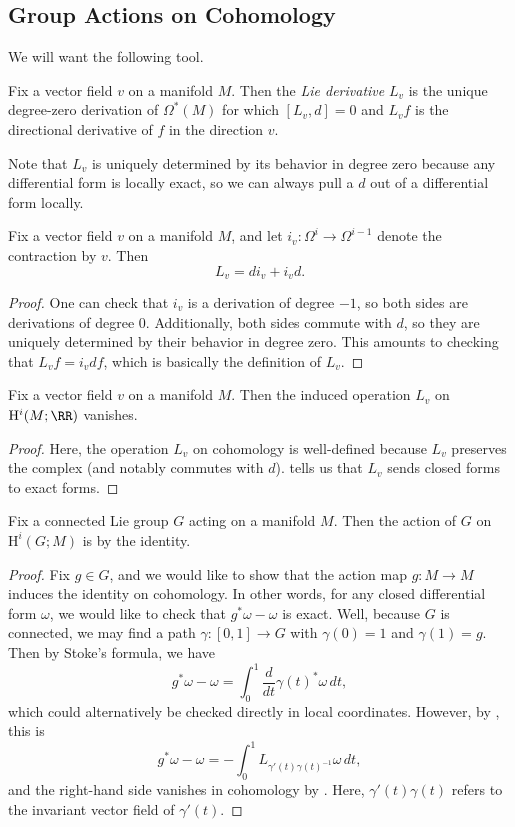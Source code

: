 \documentclass[../notes.tex]{subfiles}
\begin{document}
\subsection{Group Actions on Cohomology}
We will want the following tool.
\begin{definition}
	Fix a vector field $v$ on a manifold $M$. Then the \textit{Lie derivative} $L_v$ is the unique degree-zero derivation of $\Omega^*(M)$ for which $[L_v,d]=0$ and $L_vf$ is the directional derivative of $f$ in the direction $v$.
\end{definition}
\begin{remark}
	Note that $L_v$ is uniquely determined by its behavior in degree zero because any differential form is locally exact, so we can always pull a $d$ out of a differential form locally.
\end{remark}
\begin{proposition} \label{prop:cartan-magic}
	Fix a vector field $v$ on a manifold $M$, and let $i_v\colon\Omega^i\to\Omega^{i-1}$ denote the contraction by $v$. Then
	\[L_v=di_v+i_vd.\]
\end{proposition}
\begin{proof}
	One can check that $i_v$ is a derivation of degree $-1$, so both sides are derivations of degree $0$. Additionally, both sides commute with $d$, so they are uniquely determined by their behavior in degree zero. This amounts to checking that $L_vf=i_vdf$, which is basically the definition of $L_v$.
\end{proof}
\begin{corollary} \label{cor:vector-field-action-vanishes}
	Fix a vector field $v$ on a manifold $M$. Then the induced operation $L_v$ on $\mathrm H^i(M;\RR)$ vanishes.
\end{corollary}
\begin{proof}
	Here, the operation $L_v$ on cohomology is well-defined because $L_v$ preserves the complex (and notably commutes with $d$).  tells us that $L_v$ sends closed forms to exact forms.
\end{proof}
\begin{corollary} \label{cor:group-acts-by-identity}
	Fix a connected Lie group $G$ acting on a manifold $M$. Then the action of $G$ on $\mathrm H^i(G;M)$ is by the identity.
\end{corollary}
\begin{proof}
	Fix $g\in G$, and we would like to show that the action map $g\colon M\to M$ induces the identity on cohomology. In other words, for any closed differential form $\omega$, we would like to check that $g^*\omega-\omega$ is exact. Well, because $G$ is connected, we may find a path $\gamma\colon[0,1]\to G$ with $\gamma(0)=1$ and $\gamma(1)=g$. Then by Stoke's formula, we have
	\[g^*\omega-\omega=\int_0^1\frac d{dt}\gamma(t)^*\omega\,dt,\]
	which could alternatively be checked directly in local coordinates. However, by , this is
	\[g^*\omega-\omega=-\int_0^1L_{\gamma'(t)\gamma(t)^{-1}}\omega\,dt,\]
	and the right-hand side vanishes in cohomology by . Here, $\gamma'(t)\gamma(t)$ refers to the invariant vector field of $\gamma'(t)$.
\end{proof}
\end{document}
